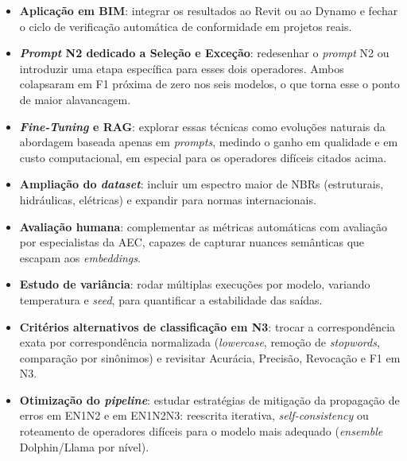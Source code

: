 \begin{itemize}
    \item \textbf{Aplicação em BIM}: integrar os resultados ao Revit ou ao Dynamo e fechar o ciclo de verificação automática de conformidade em projetos reais.
    \item \textbf{\textit{Prompt} N2 dedicado a Seleção e Exceção}: redesenhar o \textit{prompt} N2 ou introduzir uma etapa específica para esses dois operadores. Ambos colapsaram em F1 próxima de zero nos seis modelos, o que torna esse o ponto de maior alavancagem.
    \item \textbf{\textit{Fine-Tuning} e RAG}: explorar essas técnicas como evoluções naturais da abordagem baseada apenas em \textit{prompts}, medindo o ganho em qualidade e em custo computacional, em especial para os operadores difíceis citados acima.
    \item \textbf{Ampliação do \textit{dataset}}: incluir um espectro maior de NBRs (estruturais, hidráulicas, elétricas) e expandir para normas internacionais.
    \item \textbf{Avaliação humana}: complementar as métricas automáticas com avaliação por especialistas da AEC, capazes de capturar nuances semânticas que escapam aos \textit{embeddings}.
    \item \textbf{Estudo de variância}: rodar múltiplas execuções por modelo, variando temperatura e \textit{seed}, para quantificar a estabilidade das saídas.
    \item \textbf{Critérios alternativos de classificação em N3}: trocar a correspondência exata por correspondência normalizada (\textit{lowercase}, remoção de \textit{stopwords}, comparação por sinônimos) e revisitar Acurácia, Precisão, Revocação e F1 em N3.
    \item \textbf{Otimização do \textit{pipeline}}: estudar estratégias de mitigação da propagação de erros em EN1N2 e em EN1N2N3: reescrita iterativa, \textit{self-consistency} ou roteamento de operadores difíceis para o modelo mais adequado (\textit{ensemble} Dolphin/Llama por nível).
\end{itemize}
